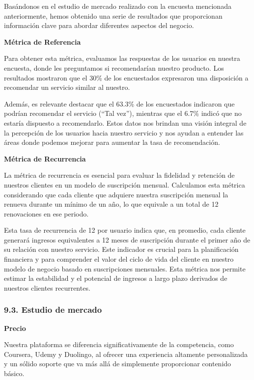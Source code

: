 \documentclass[
]{article}
\begin{document}
Basándonos en el estudio de mercado realizado con la encuesta mencionada
anteriormente, hemos obtenido una serie de resultados que proporcionan
información clave para abordar diferentes aspectos del negocio.

\textbf{Métrica de Referencia}

Para obtener esta métrica, evaluamos las respuestas de los usuarios en
nuestra encuesta, donde les preguntamos si recomendarían nuestro
producto. Los resultados mostraron que el 30\% de los encuestados
expresaron una disposición a recomendar un servicio similar al nuestro.

Además, es relevante destacar que el 63.3\% de los encuestados indicaron
que podrían recomendar el servicio (``Tal vez''), mientras que el 6.7\%
indicó que no estaría dispuesto a recomendarlo. Estos datos nos brindan
una visión integral de la percepción de los usuarios hacia nuestro
servicio y nos ayudan a entender las áreas donde podemos mejorar para
aumentar la tasa de recomendación.

\textbf{Métrica de Recurrencia}

La métrica de recurrencia es esencial para evaluar la fidelidad y
retención de nuestros clientes en un modelo de suscripción mensual.
Calculamos esta métrica considerando que cada cliente que adquiere
nuestra suscripción mensual la renueva durante un mínimo de un año, lo
que equivale a un total de 12 renovaciones en ese periodo.

Esta tasa de recurrencia de 12 por usuario indica que, en promedio, cada
cliente generará ingresos equivalentes a 12 meses de suscripción durante
el primer año de su relación con nuestro servicio. Este indicador es
crucial para la planificación financiera y para comprender el valor del
ciclo de vida del cliente en nuestro modelo de negocio basado en
suscripciones mensuales. Esta métrica nos permite estimar la estabilidad
y el potencial de ingresos a largo plazo derivados de nuestros clientes
recurrentes.

\subsubsection{9.3. Estudio de mercado}\label{estudio-de-mercado}

\textbf{Precio}

Nuestra plataforma se diferencia significativamente de la competencia,
como Coursera, Udemy y Duolingo, al ofrecer una experiencia altamente
personalizada y un sólido soporte que va más allá de simplemente
proporcionar contenido básico.
\end{document}

